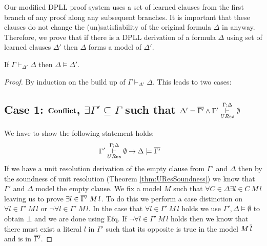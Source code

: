 %
Our modified DPLL proof system uses a set of learned clauses from the first branch of any proof along any subsequent branches. It is important that these clauses do not change the (un)satisfiability of the original formula $\Delta$ in anyway. Therefore, we prove that if there is a DPLL derivation of a formula $\Delta$ using set of learned clauses $\Delta'$ then $\Delta$ forms a model of $\Delta'$. \\
\medskip
%
\begin{mytheorem}\label{thm:learnedclause}
If $\Gamma \vdash_{\Delta'} \Delta$  then  $\Delta \models \Delta'$.
%
\begin{proof}
By induction on the build up of $\Gamma \vdash_{\Delta'} \Delta$. This leads to two  cases:
\subsection*{Case 1: $\mathbf{Conflict}$, $\exists \Gamma' \subseteq \Gamma$ such that $\Delta' = \overline{\Gamma'} \wedge \Gamma' \overset{\Gamma;\Delta}{\underset{URes}{\vdash}}\emptyset$}
We have to show the following statement holds:
%
\begin{align*}
\Gamma'& \overset{\Gamma;\Delta}{\underset{URes}{\vdash}} \emptyset\to \Delta \models \overline{\Gamma'}
\end{align*}
%
%
If we have a unit resolution derivation of the empty clause from $\Gamma'$ and $\Delta$ then by the soundness of unit resolution (Theorem \ref{thm:UResSoundness}) we know  that $\Gamma'$ and $\Delta$ model the empty clause.  We fix a model $M$ such that $\forall C \in \Delta \exists l \in C \ M \, l$  leaving us to prove $\exists l \in \overline{\Gamma'} \ M \, l$. To do this we perform a case distinction on $\forall l \in \Gamma' \ M \, l$ or $\neg \forall l \in \Gamma' \ M \, l$. In the case that $\forall l \in \Gamma' \ M \, l$ holds we use $\Gamma', \Delta \models \emptyset$ to obtain $\bot$ and we are done using Efq. If $\neg \forall l \in \Gamma' \ M \, l$ holds then we know that there must exist a literal $l$ in $\Gamma'$ such that its opposite is true in the model $M \, \overline{l}$ and is in $\overline{\Gamma'}$.
%


\end{proof}
\end{mytheorem}
